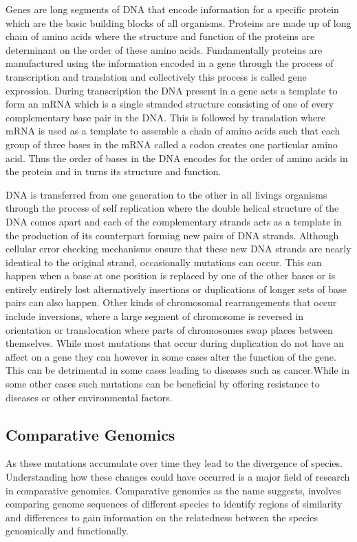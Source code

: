 Genes are long segments of DNA that encode information for a specific protein which are the basic building blocks of all organisms. Proteins are made up of long chain of amino acids where the structure and function of the proteins are determinant on the order of these amino acids. Fundamentally proteins are manufactured using the information encoded in a gene through the process of transcription and translation and collectively this process is called gene expression. During transcription the DNA present in a gene acts a template to form an mRNA which is a single stranded structure consisting of one of every complementary base pair in the DNA. This is followed by translation where mRNA is used as a template to assemble a chain of amino acids such that each group of three bases in the mRNA called a codon creates one particular amino acid. Thus the order of bases in the DNA encodes for the order of amino acids in the protein and in turns its structure and function\cite{clancy2008translation}.

DNA is transferred from one generation to the other in all livings organisms through the process of self replication where the double helical structure of the DNA comes apart and each of the complementary strands acts as a template in the production of its counterpart \cite{pray2008semi} forming new pairs of DNA strands. Although cellular error checking mechanisms ensure that these new DNA strands are nearly identical to the original strand, occasionally mutations can occur. This can happen when a base at one position is replaced by one of the other bases or is entirely entirely lost alternatively insertions or duplications of longer sets of base pairs can also happen. Other kinds of chromosomal rearrangements that occur include inversions, where a large segment of chromosome is reversed in orientation or translocation where parts of chromosomes swap places between themselves\cite{hartwell2008genetics}. While most mutations that occur during duplication do not have an affect on a gene they can however in some cases alter the function of the gene. This can be detrimental in some cases leading to diseases such as cancer.While in some other cases such mutations can be beneficial by offering resistance to diseases or other environmental factors. 

\subsection{Comparative Genomics}
As these mutations accumulate over time they lead to the divergence of species. Understanding how these changes could have occurred is a major field of research in comparative genomics. Comparative genomics as the name suggests, involves comparing genome sequences of different species to identify regions of similarity and differences to gain information on the relatedness between the species genomically and functionally.

